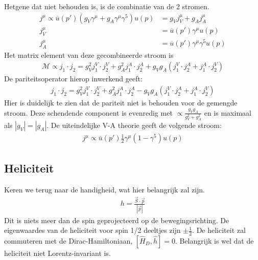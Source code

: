 \documentclass[../main.tex]{subfiles}
\begin{document}
Hetgene dat niet behouden is, is de combinatie van de 2 stromen.
\begin{equation}
    \begin{aligned}
        \label{eq:stromen_v-a}
        j^\mu \propto \overline u (p') (g_V\gamma^\mu+g_A\gamma^\mu\gamma^5)u(p) &= g_Vj_V^\mu + g_Aj_A^\mu\\
        j_V^\mu &= \overline u(p')\gamma^\mu u(p)\\
        j_A^\mu &= \overline u(p')\gamma^\mu\gamma^5 u(p)
    \end{aligned}
\end{equation}
Het matrix element van deze gecombineerde stroom is
\begin{equation}
    \begin{aligned}
        \label{eq:v-a_matrix_el}
        \mathcal{M} \propto j_1\cdot j_2 = g_V^2j_1^V\cdot j_2^V + g_A^2j_1^A\cdot j_2^A + g_Vg_A(j_1^V\cdot j_2^A+j_1^A\cdot j_2^V)
    \end{aligned}
\end{equation}
De pariteitsoperator hierop inwerkend geeft:
\begin{equation}
    \begin{aligned}
        \label{eq:v-a_stromen_par}
        j_1\cdot j_2 = g_V^2j_1^V\cdot j_2^V + g_A^2j_1^A\cdot j_2^A - g_Vg_A(j_1^V\cdot j_2^A+j_1^A\cdot j_2^V)
    \end{aligned}
\end{equation}
Hier is duidelijk te zien dat de pariteit niet is behouden voor de gemengde stroom. Deze schendende component is evenredig met $\propto \frac{g_Vg_A}{g_V^2+g_A^2}$ en is maximaal als $|g_V|=|g_A|$. De uiteindelijke V-A theorie geeft de volgende stroom:
\begin{equation}
    \begin{aligned}
        \label{eq:v-a_stromen_theorie}
        j^\mu \propto \overline u(p') \frac{1}{2} \gamma^\mu (1-\gamma^5)u(p)
    \end{aligned}
\end{equation}

\subsection{Heliciteit}%
\label{sub:heliciteit}

Keren we terug naar de handigheid, wat hier belangrijk zal zijn.
\begin{equation}
    \begin{aligned}
        \label{eq:handigheid}
        h = \frac{\vec{S} \cdot \vec{p}}{|\vec{p}|} 
    \end{aligned}
\end{equation}
Dit is niets meer dan de spin geprojecteerd op de bewegingsrichting. De eigenwaardes van de heliciteit voor spin 1/2 deeltjes zijn $\pm \frac{1}{2}$. De heliciteit zal commuteren met de Dirac-Hamiltoniaan, $[\hat{H}_D, \hat{h}]=0$. Belangrijk is wel dat de heliciteit niet Lorentz-invariant is.
\end{document}
